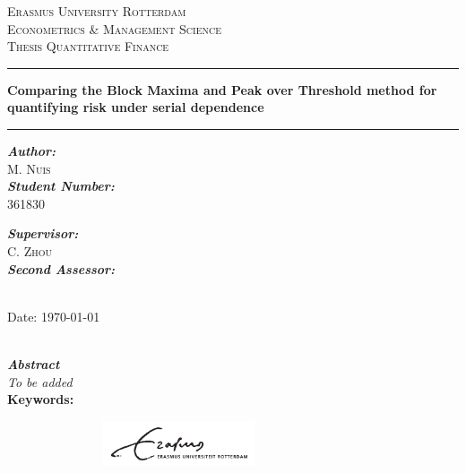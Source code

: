 \documentclass[a4paper,12pt]{article}
\theoremstyle{plain}
\begin{document}
\begin{center}
\textsc{\LARGE Erasmus University Rotterdam}\\[0.9cm]
\textsc{\Large Econometrics \& Management Science}\\[0.9cm]
\textsc{\Large Thesis Quantitative Finance}\\[1cm]


\hrule
\vspace{0.5cm}
{ \Large \bfseries Comparing the Block Maxima and Peak over Threshold method for quantifying risk under serial dependence \\[0.4cm] }
\hrule
\vspace{1.5cm}

\noindent
\begin{minipage}[t]{0.4\textwidth}
\begin{flushleft} \large
\emph{\textbf{Author:}}\\
M. \textsc{Nuis}\\
\smallskip
\emph{\textbf{Student Number:}}\\
\textsc{361830}\\
\end{flushleft}
\end{minipage}%
\begin{minipage}[t]{0.4\textwidth}
\begin{flushright} \large 
\emph{\textbf{Supervisor:}}\\
C. \textsc{Zhou}\\
\smallskip
\emph{\textbf{Second Assessor:}} \\
\\
\end{flushright}
\end{minipage}

\vspace{0.5cm}
{\large Date: \large \today\par}\\
\vspace{1cm}
\emph{\textbf{Abstract}}\\
\textit{To be added}\\ 
\vspace{0.5cm}
\hline
\vspace{0.5cm}
\textbf{Keywords:} 
\end{center}
\vspace{1cm}

\begin{figure}[h]
\includegraphics[width=8cm,height=50]{Figures/Logo_Erasmus_Universiteit_Rotterdam.png}
\end{figure}
\end{document}
